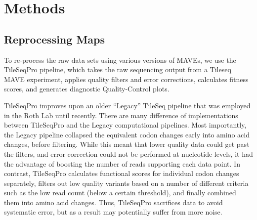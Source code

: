 \documentclass{article}
\begin{document}
\section{Methods} %
\subsection{Reprocessing Maps} 
To re-process the raw data sets using various versions of MAVEs, we use the TileSeqPro pipeline, which takes the raw sequencing output from a Tileseq MAVE experiment, applies quality filters and error corrections, calculates fitness scores, and generates diagnostic Quality-Control plots.

TileSeqPro improves upon an older ``Legacy'' TileSeq pipeline that was employed in the Roth Lab until recently.
There are many difference of implementations between TileSeqPro and the Legacy computational pipelines. Most importantly, the Legacy pipeline collapsed the equivalent codon changes early into amino acid changes, before filtering. While this meant that lower quality data could get past the filters, and error correction could not be performed at nucleotide levels, it had the advantage of boosting the number of reads supporting each data point. In contrast, TileSeqPro calculates functional scores for individual codon changes separately, filters out low quality variants based on a number of different criteria such as the low read count (below a certain threshold), and finally combined them into amino acid changes. Thus, TileSeqPro sacrifices data to avoid systematic error, but as a result may potentially suffer from more noise.  
\end{document}
